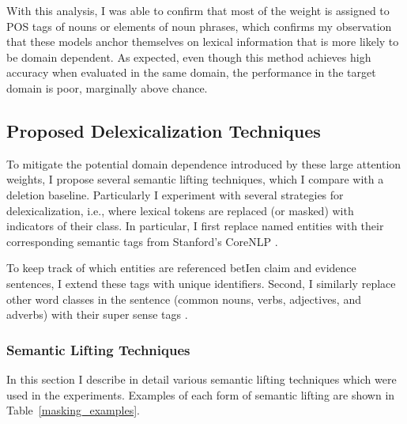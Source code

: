 \documentclass{article}
\begin{document}
 With this analysis, I was able to confirm that most of the weight is assigned to POS tags of nouns or elements of noun phrases, which confirms my observation that these models anchor themselves on lexical information that is more likely to be domain dependent. 
 As expected, even though this method achieves high accuracy when evaluated in the same domain, the performance in the target domain is poor, marginally above chance.






\subsection{Proposed Delexicalization Techniques}

To mitigate the potential domain dependence introduced by these large attention weights, I propose several semantic lifting techniques, which I compare with a deletion baseline.  
Particularly I experiment with several strategies for delexicalization, i.e., where lexical tokens are replaced (or masked) with indicators of their class. In particular, I first replace named entities with their corresponding semantic tags from Stanford's CoreNLP \citep*{manning2014stanford}. 

To keep track of which entities are referenced betIen claim and evidence sentences, I extend these tags with unique identifiers. Second, I similarly replace other word classes in the sentence (common nouns, verbs, adjectives, and adverbs)  with their super sense tags \citep*{ciaramita2003supersense}.




\subsubsection{Semantic Lifting Techniques} \label{masking_techniques}
In this section I describe in detail various semantic lifting techniques which were used in the experiments. Examples of each form of semantic lifting are shown in Table~\ref{masking_examples}.
\end{document}
